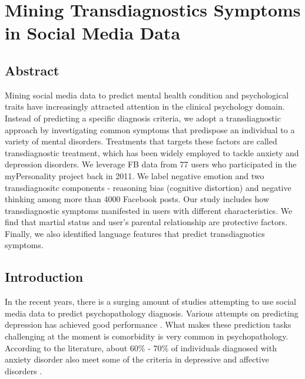 \chapter{Mining Transdiagnostics Symptoms in Social Media Data}
\section{Abstract}
Mining social media data to predict mental health condition and psychological traits have increasingly attracted attention in the clinical psychology domain. Instead of predicting a specific diagnosis criteria, we adopt a transdiagnostic approach by investigating common symptoms that  predispose an individual to a variety of mental disorders. Treatments that targets these factors are called transdiagnostic treatment, which has been widely employed to tackle anxiety and depression disorders.  We leverage FB data from 77 users who participated in the myPersonality project back in 2011.  We label negative emotion and two transdiagnositc components - reasoning bias (cognitive distortion) and negative thinking among more than 4000 Facebook posts. Our study includes how transdiagnostic symptoms manifested in users with different characteristics. We find that martial status and user's parental relationship are protective factors. Finally, we also identified language features that predict transdiagnotics symptoms.


\section{Introduction}
In the recent years, there is a surging amount of studies attempting to use social media data to predict psychopathology diagnosis. Various attempts on predicting depression has achieved good performance \cite{munmun13, Aldarwish17, Hu17, Coppersmith15}. What makes these prediction tasks challenging at the moment is comorbidity is very common in psychopathology. According to the literature, about 60\% - 70\% of individuals diagnosed with anxiety disorder also meet some of the criteria in depressive and affective disorders \cite{Timothy95}.

